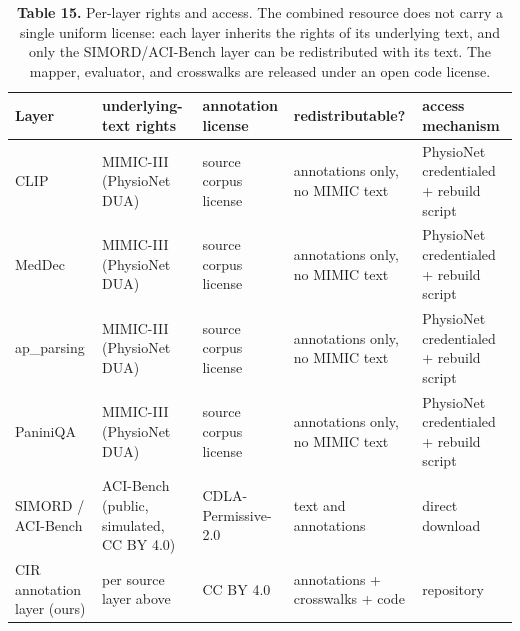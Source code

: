 \documentclass[3p,twocolumn]{elsarticle}
\begin{document}
\begin{table}[!t]
\centering
\small\setlength{\tabcolsep}{4pt}%
\small
\setlength{\tabcolsep}{4pt}
\begin{tabularx}{\linewidth}{>{\hsize=0.913\hsize\raggedright\arraybackslash}X >{\hsize=1.165\hsize\raggedright\arraybackslash}X >{\hsize=0.781\hsize\raggedright\arraybackslash}X >{\hsize=0.995\hsize\raggedright\arraybackslash}X >{\hsize=1.147\hsize\raggedright\arraybackslash}X}
\toprule
Layer & underlying-text rights & annotation license & redistributable? & access mechanism \\
\midrule
CLIP & MIMIC-III (PhysioNet DUA) & source corpus license & annotations only, no MIMIC text & PhysioNet credentialed + rebuild script \\
MedDec & MIMIC-III (PhysioNet DUA) & source corpus license & annotations only, no MIMIC text & PhysioNet credentialed + rebuild script \\
ap\_\allowbreak{}parsing & MIMIC-III (PhysioNet DUA) & source corpus license & annotations only, no MIMIC text & PhysioNet credentialed + rebuild script \\
PaniniQA & MIMIC-III (PhysioNet DUA) & source corpus license & annotations only, no MIMIC text & PhysioNet credentialed + rebuild script \\
SIMORD / ACI-Bench & ACI-Bench (public, simulated, CC BY 4.0) & CDLA-Permissive-2.0 & text and annotations & direct download \\
CIR annotation layer (ours) & per source layer above & CC BY 4.0 & annotations + crosswalks + code & repository \\
\bottomrule
\end{tabularx}
\caption{\textbf{Table 15.} Per-layer rights and access. The combined resource does not carry a single uniform license: each layer inherits the rights of its underlying text, and only the SIMORD/ACI-Bench layer can be redistributed with its text. The mapper, evaluator, and crosswalks are released under an open code license.}
\end{table}
\end{document}
